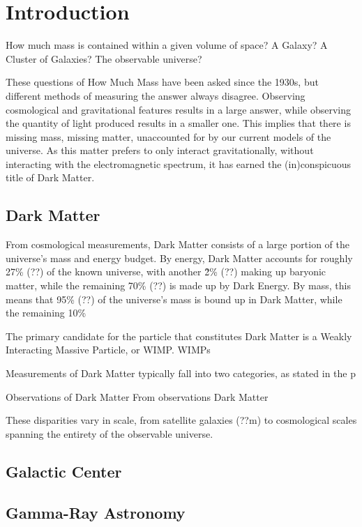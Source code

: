 \cleartooddpage[\thispagestyle{empty}]
\chapter{Introduction}

How much mass is contained within a given volume of space?
A Galaxy?
A Cluster of Galaxies?
The observable universe?

These questions of How Much Mass have been asked since the 1930s, but different methods of measuring the answer always disagree.
Observing cosmological and gravitational features results in a large answer, while observing the quantity of light produced results in a smaller one.
This implies that there is missing mass, missing matter, unaccounted for by our current models of the universe.
As this matter prefers to only interact gravitationally, without interacting with the electromagnetic spectrum, it has earned the (in)conspicuous title of Dark Matter.


\section{Dark Matter}

From cosmological measurements, Dark Matter consists of a large portion of the universe's mass and energy budget.
By energy, Dark Matter accounts for roughly 27\% (??) of the known universe, with another \~2\% (??) making up baryonic matter, while the remaining 70\% (??) is made up by Dark Energy.
By mass, this means that 95\% (??) of the universe's mass is bound up in Dark Matter, while the remaining 10\%



The primary candidate for the particle that constitutes Dark Matter is a Weakly Interacting Massive Particle, or WIMP.
WIMPs 

Measurements of Dark Matter typically fall into two categories, as stated in the p

Observations of Dark Matter
From observations
Dark Matter 

These disparities vary in scale, from satellite galaxies (??m) to cosmological scales spanning the entirety of the observable universe.




\section{Galactic Center}

\section{Gamma-Ray Astronomy}


